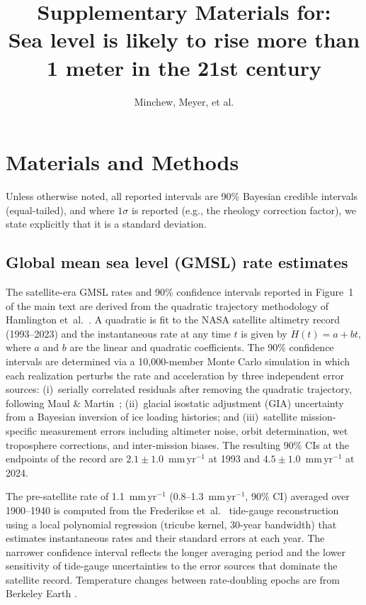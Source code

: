 \documentclass[12pt]{article}
\title{Supplementary Materials for:\\Sea level is likely to rise more than 1 meter in the 21st century}
\author{Minchew, Meyer, et al.}
\date{}
\begin{document}
\maketitle

\tableofcontents
\clearpage

\setcounter{secnumdepth}{3}

\section{Materials and Methods}

Unless otherwise noted, all reported intervals are 90\% Bayesian credible intervals (equal-tailed), and where $1\sigma$ is reported (e.g., the rheology correction factor), we state explicitly that it is a standard deviation.

\subsection{Global mean sea level (GMSL) rate estimates}

The satellite-era GMSL rates and 90\% confidence intervals reported in Figure~1 of the main text are derived from the quadratic trajectory methodology of Hamlington et~al.~\citep{Hamlington2024}. A quadratic is fit to the NASA satellite altimetry record (1993--2023) and the instantaneous rate at any time $t$ is given by $\dot{H}(t) = a + bt$, where $a$ and $b$ are the linear and quadratic coefficients. The 90\% confidence intervals are determined via a 10,000-member Monte Carlo simulation in which each realization perturbs the rate and acceleration by three independent error sources: (i)~serially correlated residuals after removing the quadratic trajectory, following Maul \& Martin~\citep{Maul1993}; (ii)~glacial isostatic adjustment (GIA) uncertainty from a Bayesian inversion of ice loading histories; and (iii)~satellite mission-specific measurement errors including altimeter noise, orbit determination, wet troposphere corrections, and inter-mission biases. The resulting 90\% CIs at the endpoints of the record are $2.1 \pm 1.0$~mm\,yr$^{-1}$ at 1993 and $4.5 \pm 1.0$~mm\,yr$^{-1}$ at 2024.

The pre-satellite rate of 1.1~mm\,yr$^{-1}$ (0.8--1.3~mm\,yr$^{-1}$, 90\% CI) averaged over 1900--1940 is computed from the Frederikse et~al.~\citep{Frederikse2020} tide-gauge reconstruction using a local polynomial regression (tricube kernel, 30-year bandwidth) that estimates instantaneous rates and their standard errors at each year. The narrower confidence interval reflects the longer averaging period and the lower sensitivity of tide-gauge uncertainties to the error sources that dominate the satellite record. Temperature changes between rate-doubling epochs are from Berkeley Earth \citep{Rohde2020}.
\end{document}
